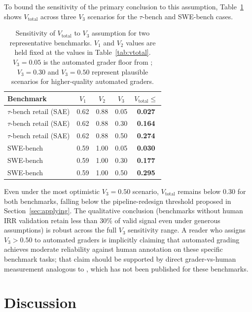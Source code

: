 \documentclass[preprint,12pt]{elsarticle}
\newcommand{\vtot}{V_{\text{total}}}
\begin{document}
To bound the sensitivity of the primary conclusion to this assumption, Table~\ref{tab:sensitivity}
shows $\vtot$ across three $V_3$ scenarios for the $\tau$-bench and SWE-bench cases.

\begin{table}[ht]
\centering
\caption{Sensitivity of $\vtot$ to $V_3$ assumption for two representative benchmarks.
$V_1$ and $V_2$ values are held fixed at the values in Table~\ref{tab:vtotal}.
$V_3 = 0.05$ is the automated grader floor from \citet{gurram2026};
$V_3 = 0.30$ and $V_3 = 0.50$ represent plausible scenarios for higher-quality
automated graders.}
\label{tab:sensitivity}
\small
\begin{tabular}{@{}lcccc@{}}
\toprule
Benchmark & $V_1$ & $V_2$ & $V_3$ & $\vtot \leq$ \\
\midrule
$\tau$-bench retail (SAE) & 0.62 & 0.88 & 0.05 & \textbf{0.027} \\
$\tau$-bench retail (SAE) & 0.62 & 0.88 & 0.30 & \textbf{0.164} \\
$\tau$-bench retail (SAE) & 0.62 & 0.88 & 0.50 & \textbf{0.274} \\
\midrule
SWE-bench & 0.59 & 1.00 & 0.05 & \textbf{0.030} \\
SWE-bench & 0.59 & 1.00 & 0.30 & \textbf{0.177} \\
SWE-bench & 0.59 & 1.00 & 0.50 & \textbf{0.295} \\
\bottomrule
\end{tabular}
\end{table}

Even under the most optimistic $V_3 = 0.50$ scenario, $\vtot$ remains below 0.30
for both benchmarks, falling below the pipeline-redesign threshold proposed in
Section~\ref{sec:applying}. The qualitative conclusion (benchmarks without human IRR
validation retain less than 30\% of valid signal even under generous assumptions)
is robust across the full $V_3$ sensitivity range. A reader who assigns $V_3 > 0.50$
to automated graders is implicitly claiming that automated grading achieves moderate
reliability against human annotation on these specific benchmark tasks; that claim
should be supported by direct grader-vs-human measurement analogous to
\citet{gurram2026}, which has not been published for these benchmarks.

\section{Discussion}
\label{sec:discussion}
\end{document}
